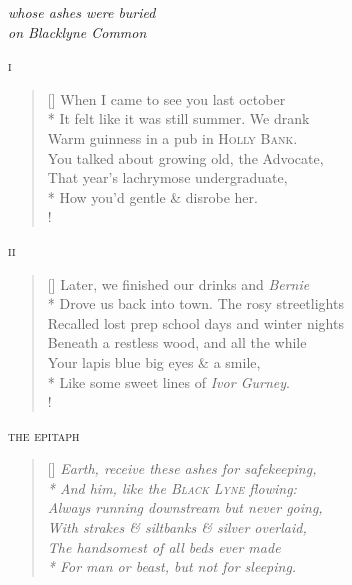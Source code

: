 \begin{center}
\textit{whose ashes were buried}\\
\textit{on Blacklyne Common}
\end{center}

\bigskip

\begin{center}
\textsc{i}
\end{center}

\settowidth{\versewidth}{It felt like it was still summer. We drank}
\begin{verse}[\versewidth]
When I came to see you last october\\*
It felt like it was still summer. We drank\\
Warm guinness in a pub in \textsc{Holly Bank}.\\
You talked about growing old, the {\hoskeroe Advocate},\\
That year's lachrymose undergraduate,\\*
How you'd gentle \& disrobe her.\\!
\end{verse}

\bigskip

\begin{center}
\textsc{ii}
\end{center}

\settowidth{\versewidth}{It felt like it was still summer. We drank}
\begin{verse}[\versewidth]
Later, we finished our drinks and \textit{Bernie}\\*
Drove us back into town. The rosy streetlights\\
Recalled lost prep school days and winter nights\\
Beneath a restless wood, and all the while\\
Your lapis blue big eyes \&  a smile,\\*
Like some  sweet lines of \textit{Ivor Gurney}.\\!
\end{verse}

\bigskip

\begin{center}
\textsc{the epitaph}
\end{center}

\settowidth{\versewidth}{It felt like it was still summer. We drank}
\begin{verse}[\versewidth]
\it Earth, receive these ashes for safekeeping,\\*
And him, like the \textsc{Black Lyne} flowing:\\
Always running downstream but never going,\\
With strakes \& siltbanks \& silver overlaid,\\
The handsomest of all beds ever made\\*
For man or beast, but not for sleeping.
\end{verse}
